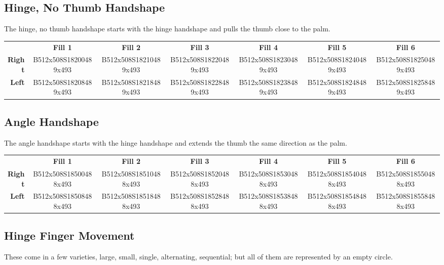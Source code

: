 \documentclass{article}
\begin{document}
\subsection{Hinge, No Thumb Handshape}

The hinge, no thumb handshape starts with the hinge handshape and pulls the thumb close to the palm.

\begin{center}
\begin{tabular}{r*{6}{c}}
&\textbf{Fill 1}&\textbf{Fill 2}&\textbf{Fill 3}&\textbf{Fill 4}&\textbf{Fill 5}&\textbf{Fill 6}\\
\textbf{Right}&
B512x508S18200489x493&
B512x508S18210489x493&
B512x508S18220489x493&
B512x508S18230489x493&
B512x508S18240489x493&
B512x508S18250489x493\\
\textbf{Left}&
B512x508S18208489x493&
B512x508S18218489x493&
B512x508S18228489x493&
B512x508S18238489x493&
B512x508S18248489x493&
B512x508S18258489x493\\
\end{tabular}
\end{center}

\subsection{Angle Handshape}

The angle handshape starts with the hinge handshape and extends the thumb the same direction as the palm.

\begin{center}
\begin{tabular}{r*{6}{c}}
&\textbf{Fill 1}&\textbf{Fill 2}&\textbf{Fill 3}&\textbf{Fill 4}&\textbf{Fill 5}&\textbf{Fill 6}\\
\textbf{Right}&
B512x508S18500488x493&
B512x508S18510488x493&
B512x508S18520488x493&
B512x508S18530488x493&
B512x508S18540488x493&
B512x508S18550488x493\\
\textbf{Left}&
B512x508S18508488x493&
B512x508S18518488x493&
B512x508S18528488x493&
B512x508S18538488x493&
B512x508S18548488x493&
B512x508S18558488x493\\
\end{tabular}
\end{center}

\subsection{Hinge Finger Movement}

These come in a few varieties, large, small, single, alternating, sequential; but all of them are represented by an empty circle.
\end{document}
